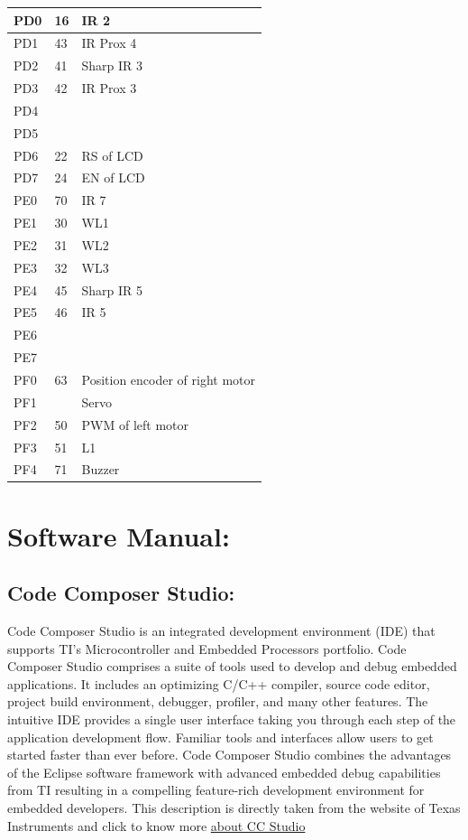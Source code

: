 \documentclass[a4paper,10pt,oneside]{article}
\begin{document}
{\begin{longtable}{|p{}|p{}|p{}|}
			PD0	&16	&IR 2\\ \hline
			PD1&	43&	IR Prox 4\\ \hline
			PD2&	41&	Sharp IR 3\\ \hline
			PD3&	42&	IR Prox 3\\ \hline
			PD4&	&	\\ \hline
			PD5&	&	\\ \hline
			PD6&	22&	RS of LCD\\ \hline
			PD7&	24&	EN of LCD\\ \hline
			
			PE0&	70&IR 7\\ \hline
			PE1&	30&	WL1\\ \hline
			PE2&	31&	WL2\\ \hline
			PE3&	32&	WL3\\ \hline
			PE4&	45&	Sharp IR 5\\ \hline
			PE5&	46&	IR 5\\ \hline
			PE6&	&\\ \hline
			PE7&	&	\\ \hline
			
			PF0&	63&	Position encoder of right motor\\ \hline
			PF1&	&	Servo\\ \hline
			PF2&	50&	PWM of left motor\\ \hline
			PF3&	51	&L1\\ \hline
			PF4&	71&	Buzzer\\ \hline
			
		\end{longtable}
	\newpage
	\section{\Huge\textbf{Software Manual:}}
		\subsection{\huge \textbf{Code Composer Studio:}}
			{\large Code Composer Studio is an integrated development environment (IDE) that supports TI's Microcontroller and Embedded Processors portfolio. Code Composer Studio comprises a suite of tools used to develop and debug embedded applications. It includes an optimizing C/C++ compiler, source code editor, project build environment, debugger, profiler, and many other features. The intuitive IDE provides a single user interface taking you through each step of the application development flow. Familiar tools and interfaces allow users to get started faster than ever before. Code Composer Studio combines the advantages of the Eclipse software framework with advanced embedded debug capabilities from TI resulting in a compelling feature-rich development environment for embedded developers. This description is directly taken from the website of Texas Instruments and click to know more	\href{http://www.ti.com/tool/ccstudio}{about CC Studio}}}%
\end{document}
